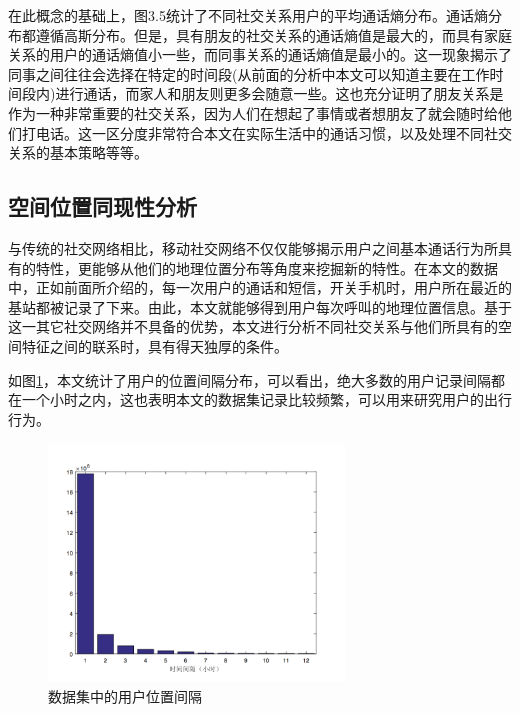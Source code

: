 在此概念的基础上，图3.5统计了不同社交关系用户的平均通话熵分布。通话熵分布都遵循高斯分布。但是，具有朋友的社交关系的通话熵值是最大的，而具有家庭关系的用户的通话熵值小一些，而同事关系的通话熵值是最小的。这一现象揭示了同事之间往往会选择在特定的时间段(从前面的分析中本文可以知道主要在工作时间段内)进行通话，而家人和朋友则更多会随意一些。这也充分证明了朋友关系是作为一种非常重要的社交关系，因为人们在想起了事情或者想朋友了就会随时给他们打电话。这一区分度非常符合本文在实际生活中的通话习惯，以及处理不同社交关系的基本策略等等。

\subsection{空间位置同现性分析}

与传统的社交网络相比，移动社交网络不仅仅能够揭示用户之间基本通话行为所具有的特性，更能够从他们的地理位置分布等角度来挖掘新的特性。在本文的数据中，正如前面所介绍的，每一次用户的通话和短信，开关手机时，用户所在最近的基站都被记录了下来。由此，本文就能够得到用户每次呼叫的地理位置信息。基于这一其它社交网络并不具备的优势，本文进行分析不同社交关系与他们所具有的空间特征之间的联系时，具有得天独厚的条件。

如图\ref{fig-position-stamp}，本文统计了用户的位置间隔分布，可以看出，绝大多数的用户记录间隔都在一个小时之内，这也表明本文的数据集记录比较频繁，可以用来研究用户的出行行为。

\begin{figure}[ht]
    \centering
    \includegraphics[scale=1, width=0.7\textwidth]{figure/timestamp.PNG}
    \caption{数据集中的用户位置间隔}
    \label{fig-position-stamp}
\end{figure}


